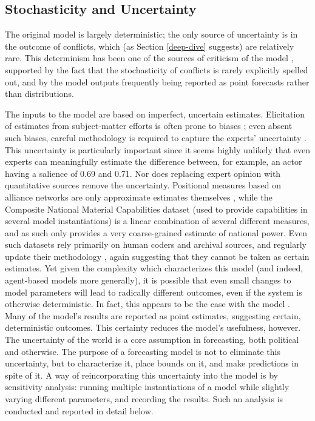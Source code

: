 \subsection{Stochasticity and Uncertainty}

The original model is largely deterministic; the only source of uncertainty is in the outcome of conflicts, which (as Section \ref{deep-dive} suggests) are relatively rare. This determinism has been one of the sources of criticism of the model \citep{brandt_2011}, supported by the fact that the stochasticity of conflicts is rarely explicitly spelled out, and by the model outputs frequently being reported as point forecasts rather than distributions. 

The inputs to the model are based on imperfect, uncertain estimates. Elicitation of estimates from subject-matter efforts is often prone to biases \citep{morgan_2014,tetlock_2005}; even absent such biases, careful methodology is required to capture the experts' uncertainty \citep{gill_2013}. This uncertainty is particularly important since it seems highly unlikely that even experts can meaningfully estimate the difference between, for example, an actor having a salience of 0.69 and 0.71. Nor does replacing expert opinion with quantitative sources remove the uncertainty. Positional measures based on alliance networks are only approximate estimates themselves \citep{signorino_1999b}, while the Composite National Material Capabilities dataset \citep{grieg_2010} (used to provide capabilities in several model instantiations) is a linear combination of several different measures, and as such only provides a very coarse-grained estimate of national power. Even such datasets rely primarily on human coders and archival sources, and regularly update their methodology \citep{gibler_2004}, again suggesting that they cannot be taken as certain estimates. Yet given the complexity which characterizes this model (and indeed, agent-based models more generally), it is possible that even small changes to model parameters will lead to radically different outcomes, even if the system is otherwise deterministic. In fact, this appears to be the case with the \citet{scholz_2011} model \citep{masad_2014b}. Many of the model's results are reported as point estimates, suggesting certain, deterministic outcomes. This certainty reduces the model's usefulness, however. The uncertainty of the world is a core assumption in forecasting, both political and otherwise. The purpose of a forecasting model is not to eliminate this uncertainty, but to characterize it, place bounds on it, and make predictions in spite of it. A way of reincorporating this uncertainty into the model is by sensitivity analysis: running multiple instantiations of a model while slightly varying different parameters, and recording the results. Such an analysis is conducted and reported in detail below.


